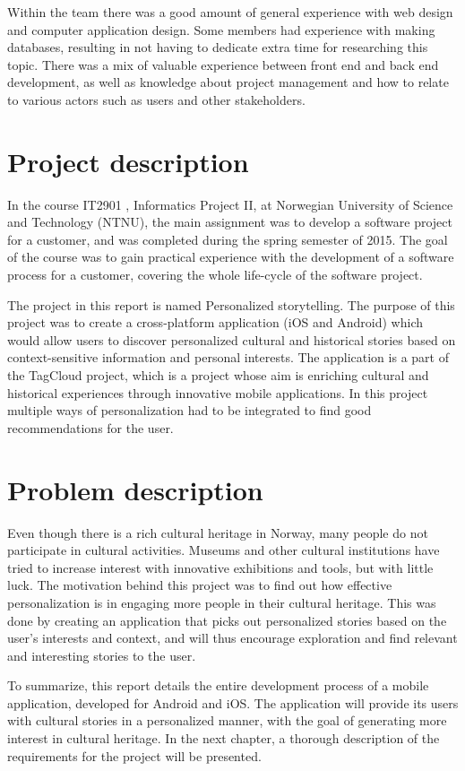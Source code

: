 Within the team there was a good amount of general experience with web design and computer application design. Some members had experience with making databases, resulting in not having to dedicate extra time for researching this topic. There was a mix of valuable experience between front end and back end development, as well as knowledge about project management and how to relate to various actors such as users and other stakeholders.

\section{Project description}

In the course IT2901 \cite{es20}, Informatics Project II, at Norwegian University of Science and Technology (NTNU), the main assignment was to develop a software project for a customer, and was completed during the spring semester of 2015. The goal of the course was to gain practical experience with the development of a software process for a customer, covering the whole life-cycle of the software project.

The project in this report is named Personalized storytelling. The purpose of this project was to create a cross-platform application (iOS and Android) which would allow users to discover personalized cultural and historical stories based on context-sensitive information and personal interests. The application is a part of the TagCloud \cite{es21} project, which is a project whose aim is enriching cultural and historical experiences through innovative mobile applications.
In this project multiple ways of personalization had to be integrated to find good recommendations for the user.

\section{Problem description}

Even though there is a rich cultural heritage in Norway, many people do not participate in cultural activities. Museums and other cultural institutions have tried to increase interest with innovative exhibitions and tools, but with little luck. The motivation behind this project was to find out how effective personalization is in engaging more people in their cultural heritage. This was done by creating an application that picks out personalized stories based on the user's interests and context, and will thus encourage exploration and find relevant and interesting stories to the user. 

To summarize, this report details the entire development process of a mobile application, developed for Android and iOS. The application will provide its users with cultural stories in a personalized manner, with the goal of generating more interest in cultural heritage. In the next chapter, a thorough description of the requirements for the project will be presented.

\cleardoublepage